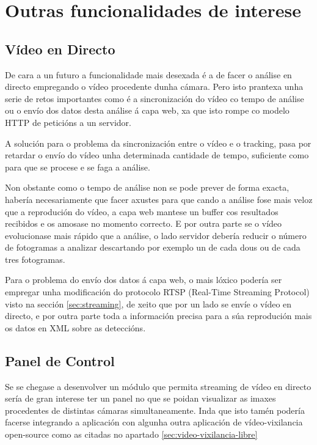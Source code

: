     
    \section{Outras funcionalidades de interese}
    
        \subsection{Vídeo en Directo}
            De cara a un futuro a funcionalidade mais desexada é a de facer o análise en directo 
            empregando o vídeo procedente dunha cámara. Pero isto prantexa unha serie de retos 
            importantes como é a sincronización do vídeo co tempo de análise ou o envío dos datos desta 
            análise á capa web, xa que isto rompe co modelo HTTP de peticións a un servidor.
            
            A solución para o problema da sincronización entre o vídeo e o tracking, pasa por retardar o
            envío do vídeo unha determinada cantidade de tempo, suficiente como para que se procese e se
            faga a análise.
            
            Non obstante como o tempo de análise non se pode prever de forma exacta, habería
            necesariamente que facer axustes para que cando a análise fose mais veloz que a reprodución
            do vídeo, a capa web mantese un buffer cos resultados recibidos e os amosase no momento 
            correcto. E por outra parte se o vídeo evolucionase mais rápido que a análise, o lado 
            servidor debería reducir o número de fotogramas a analizar descartando por exemplo un de
            cada dous ou de cada tres fotogramas.
            
            Para o problema do envío dos datos á capa web, o mais lóxico podería ser empregar unha 
            modificación do protocolo RTSP (Real-Time Streaming Protocol) visto na sección 
            \ref{sec:streaming}, de xeito que por un lado se envíe o vídeo en directo, e por outra parte
            toda a información precisa para a súa reprodución mais os datos en XML sobre as deteccións.
        
        \subsection{Panel de Control}
            Se se chegase a desenvolver un módulo que permita streaming de vídeo en directo sería de
            gran interese ter un panel no que se poidan visualizar as imaxes procedentes de 
            distintas cámaras simultaneamente. Inda que isto tamén podería facerse integrando a 
            aplicación con algunha outra aplicación de vídeo-vixilancia open-source como as citadas 
            no apartado \ref{sec:video-vixilancia-libre}
  
  
  
  
  
  
  
  
  
  
